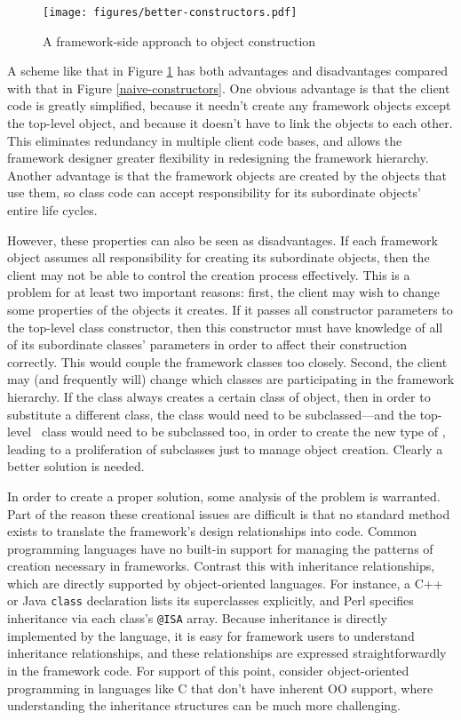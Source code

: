 \begin{figure}
\texttt{[image: figures/better-constructors.pdf]}
\caption{A framework-side approach to object construction}
\label{better-constructors}
\end{figure}

A scheme like that in Figure \ref{better-constructors} has both
advantages and disadvantages compared with that in Figure
\ref{naive-constructors}.  One obvious advantage is that the client
code is greatly simplified, because it needn't create any framework
objects except the top-level object, and because it doesn't have to
link the objects to each other.  This eliminates redundancy in
multiple client code bases, and allows the framework designer greater
flexibility in redesigning the framework hierarchy.  Another advantage
is that the framework objects are created by the objects that use
them, so class code can accept responsibility for its subordinate
objects' entire life cycles.

However, these properties can also be seen as disadvantages.  If each
framework object assumes all responsibility for creating its
subordinate objects, then the client may not be able to control the
creation process effectively.  This is a problem for at least two
important reasons: first, the client may wish to change some
properties of the objects it creates.  If it passes all constructor
parameters to the top-level class constructor, then this constructor
must have knowledge of all of its subordinate classes' parameters in
order to affect their construction correctly.  This would couple the
framework classes too closely.  Second, the client may (and frequently
will) change which classes are participating in the framework
hierarchy.  If the  class always creates a certain
class of  object, then in order to substitute a
different  class, the  class
would need to be subclassed---and the top-level \aicat\ class would
need to be subclassed too, in order to create the new type of
, leading to a proliferation of subclasses just to
manage object creation.  Clearly a better solution is needed.

In order to create a proper solution, some analysis of the problem is
warranted.  Part of the reason these creational issues are difficult
is that no standard method exists to translate the framework's design
relationships into code.  Common programming languages have no
built-in support for managing the patterns of creation necessary in
frameworks.  Contrast this with inheritance relationships, which are
directly supported by object-oriented languages.  For instance, a C++
or Java \texttt{class} declaration lists its superclasses explicitly,
and Perl specifies inheritance via each class's \texttt{@ISA} array.
Because inheritance is directly implemented by the language, it is
easy for framework users to understand inheritance relationships, and
these relationships are expressed straightforwardly in the framework
code.  For support of this point, consider object-oriented programming
in languages like C that don't have inherent OO support, where
understanding the inheritance structures can be much more
challenging.\cite[p. 7]{fayad:99}

